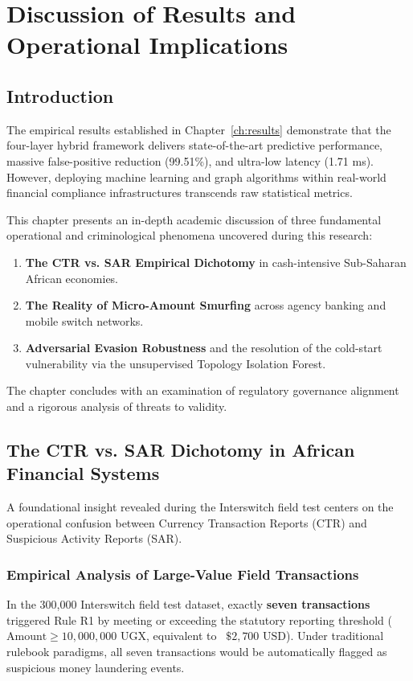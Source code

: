 \chapter{Discussion of Results and Operational Implications} \label{ch:discussion}

\section{Introduction}
The empirical results established in Chapter~\ref{ch:results} demonstrate that the four-layer hybrid framework delivers state-of-the-art predictive performance, massive false-positive reduction (99.51\%), and ultra-low latency (1.71 ms). However, deploying machine learning and graph algorithms within real-world financial compliance infrastructures transcends raw statistical metrics. 

This chapter presents an in-depth academic discussion of three fundamental operational and criminological phenomena uncovered during this research:
\begin{enumerate}
    \item \textbf{The CTR vs. SAR Empirical Dichotomy} in cash-intensive Sub-Saharan African economies.
    \item \textbf{The Reality of Micro-Amount Smurfing} across agency banking and mobile switch networks.
    \item \textbf{Adversarial Evasion Robustness} and the resolution of the cold-start vulnerability via the unsupervised Topology Isolation Forest.
\end{enumerate}
The chapter concludes with an examination of regulatory governance alignment and a rigorous analysis of threats to validity.

\section{The CTR vs. SAR Dichotomy in African Financial Systems}
A foundational insight revealed during the Interswitch field test centers on the operational confusion between Currency Transaction Reports (CTR) and Suspicious Activity Reports (SAR). 

\subsection{Empirical Analysis of Large-Value Field Transactions}
In the 300,000 Interswitch field test dataset, exactly \textbf{seven transactions} triggered Rule R1 by meeting or exceeding the statutory reporting threshold ($\text{Amount} \ge 10,000,000\text{ UGX}$, equivalent to ~$\$2,700\text{ USD}$). Under traditional rulebook paradigms, all seven transactions would be automatically flagged as suspicious money laundering events.

